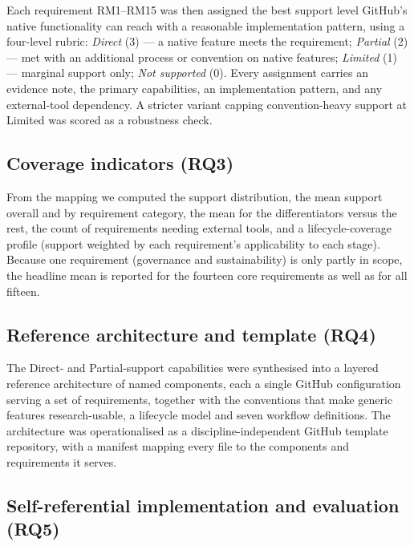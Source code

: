 \documentclass[pdflatex,sn-mathphys-num]{sn-jnl}%
\begin{document}
Each requirement RM1--RM15 was then assigned the best support level GitHub's native functionality can reach with a reasonable implementation pattern, using a four-level rubric: \emph{Direct} (3) --- a native feature meets the requirement; \emph{Partial} (2) --- met with an additional process or convention on native features; \emph{Limited} (1) --- marginal support only; \emph{Not supported} (0). Every assignment carries an evidence note, the primary capabilities, an implementation pattern, and any external-tool dependency. A stricter variant capping convention-heavy support at Limited was scored as a robustness check.

\subsection{Coverage indicators (RQ3)}\label{sec:m-coverage}

From the mapping we computed the support distribution, the mean support overall and by requirement category, the mean for the differentiators versus the rest, the count of requirements needing external tools, and a lifecycle-coverage profile (support weighted by each requirement's applicability to each stage). Because one requirement (governance and sustainability) is only partly in scope, the headline mean is reported for the fourteen core requirements as well as for all fifteen.

\subsection{Reference architecture and template (RQ4)}\label{sec:m-arch}

The Direct- and Partial-support capabilities were synthesised into a layered reference architecture of named components, each a single GitHub configuration serving a set of requirements, together with the conventions that make generic features research-usable, a lifecycle model and seven workflow definitions. The architecture was operationalised as a discipline-independent GitHub template repository, with a manifest mapping every file to the components and requirements it serves.

\subsection{Self-referential implementation and evaluation (RQ5)}\label{sec:m-eval}
\end{document}
